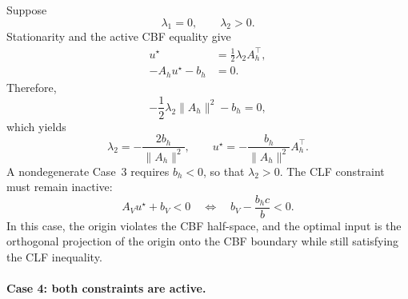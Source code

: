 \documentclass[../../master-handout.tex]{subfiles}
\begin{document}
Suppose
\begin{equation}
    \lambda_1=0,
    \qquad
    \lambda_2>0.
\end{equation}
Stationarity and the active CBF equality give
\begin{align}
    u^\star&=\frac{1}{2}\lambda_2A_h^\top,
    \\
    -A_hu^\star-b_h&=0.
\end{align}
Therefore,
\begin{equation}
    -\frac{1}{2}\lambda_2\|A_h\|^2-b_h=0,
\end{equation}
which yields
\begin{equation}
    \lambda_2
    =
    -\frac{2b_h}{\|A_h\|^2},
    \qquad
    u^\star
    =
    -\frac{b_h}{\|A_h\|^2}A_h^\top.
    \label{eq:lec23-case3}
\end{equation}
A nondegenerate Case~3 requires $b_h<0$, so that $\lambda_2>0$. The CLF constraint must remain inactive:
\begin{equation}
    A_Vu^\star+b_V<0
    \quad\Longleftrightarrow\quad
    b_V-\frac{b_hc}{b}<0.
    \label{eq:lec23-case3-inactive}
\end{equation}
In this case, the origin violates the CBF half-space, and the optimal input is the orthogonal projection of the origin onto the CBF boundary while still satisfying the CLF inequality.

\paragraph{Case 4: both constraints are active.}
\end{document}
